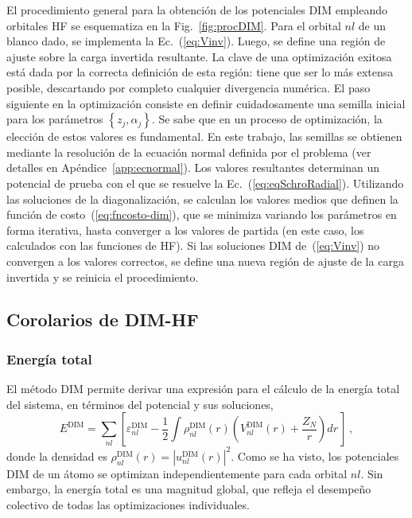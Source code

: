 El procedimiento general para la obtención de los potenciales DIM 
empleando orbitales HF se esquematiza en la Fig.~\ref{fig:procDIM}. Para 
el orbital $nl$ de un blanco dado, se implementa la Ec.~(\ref{eq:Vinv}). 
Luego, se define una región de ajuste sobre la carga invertida 
resultante. La clave de una optimización exitosa está dada por la 
correcta definición de esta región: tiene que ser lo más extensa 
posible, descartando por completo cualquier divergencia numérica. El 
paso siguiente en la optimización consiste en definir cuidadosamente una 
semilla inicial para los parámetros $\left\{z_j,\alpha_j\right\}$. Se 
sabe que en un proceso de optimización, la elección de estos valores es 
fundamental. En este trabajo, las semillas se obtienen mediante la 
resolución de la ecuación normal definida por el problema (ver detalles 
en Apéndice~\ref{app:ecnormal}). Los valores resultantes determinan un 
potencial de prueba con el que se resuelve la 
Ec.~(\ref{eq:eqSchroRadial}). Utilizando las soluciones de la 
diagonalización, se calculan los valores medios que definen la función 
de costo~(\ref{eq:fncosto-dim}), que se minimiza variando los parámetros 
en forma iterativa, hasta converger a los valores de partida (en este 
caso, los calculados con las funciones de HF). Si las soluciones DIM 
de~(\ref{eq:Vinv}) no convergen a los valores correctos, se define una 
nueva región de ajuste de la carga invertida y se reinicia el 
procedimiento.

\subsection{Corolarios de DIM-HF}
\label{sec:corolarios}

\subsubsection*{Energía total}

El método DIM permite derivar una expresión para el cálculo de la 
energía total del sistema, en términos del potencial y sus soluciones,
\begin{equation}
E^{\mathrm{DIM}} = \sum\limits_{nl} 
\left[ 
\varepsilon_{nl}^{\mathrm{DIM}} - 
\frac{1}{2}\int  \rho_{nl}^{\mathrm{DIM}}(r)
\left( V_{nl}^{\mathrm{DIM}}(r) + \frac{Z_{N}}{r}\right) dr \,
\right] \, ,
\label{eq:Etotal}
\end{equation}
donde la densidad es 
$\rho_{nl}^{\mathrm{DIM}}(r)=|u_{nl}^{\mathrm{DIM}}(r)|^2$. 
Como se ha visto, los potenciales DIM de un átomo se optimizan 
independientemente para cada orbital $nl$. Sin embargo, la energía total 
es una magnitud global, que refleja el desempeño colectivo de todas las 
optimizaciones individuales.

